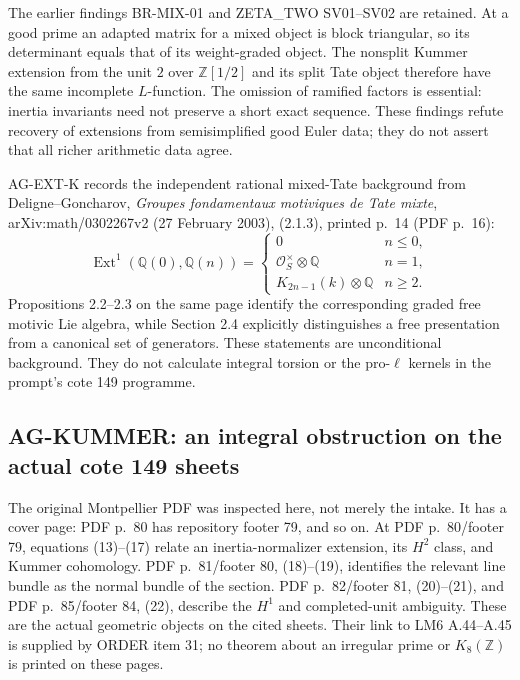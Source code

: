 \documentclass[11pt,a4paper]{article}
\begin{document}
The earlier findings BR-MIX-01 and ZETA\_TWO SV01--SV02 are retained.
At a good prime an adapted matrix for a mixed object is block triangular,
so its determinant equals that of its weight-graded object. The nonsplit
Kummer extension from the unit $2$ over $\mathbb Z[1/2]$ and its split
Tate object therefore have the same incomplete $L$-function. The omission
of ramified factors is essential: inertia invariants need not preserve a
short exact sequence. These findings refute recovery of extensions from
semisimplified good Euler data; they do not assert that all richer
arithmetic data agree.

AG-EXT-K records the independent rational mixed-Tate background from Deligne--Goncharov,
\emph{Groupes fondamentaux motiviques de Tate mixte},
arXiv:math/0302267v2 (27 February 2003), (2.1.3), printed p.~14
(PDF p.~16):
\[
 \operatorname{Ext}^1(\mathbb Q(0),\mathbb Q(n))=
 \begin{cases}
 0&n\le0,\\
 \mathcal O_S^\times\otimes\mathbb Q&n=1,\\
 K_{2n-1}(k)\otimes\mathbb Q&n\ge2.
 \end{cases}
\]
Propositions 2.2--2.3 on the same page identify the corresponding graded
free motivic Lie algebra, while Section 2.4 explicitly distinguishes a
free presentation from a canonical set of generators. These statements
are unconditional background. They do not calculate integral torsion or
the pro-$\ell$ kernels in the prompt's cote 149 programme.

\subsection{AG-KUMMER: an integral obstruction on the actual cote 149 sheets}
\label{ag:kummer}

The original Montpellier PDF was inspected here, not merely the intake.
It has a cover page: PDF p.~80 has repository footer 79, and so on.
At PDF p.~80/footer 79, equations (13)--(17) relate an inertia-normalizer
extension, its $H^2$ class, and Kummer cohomology. PDF p.~81/footer 80,
(18)--(19), identifies the relevant line bundle as the normal bundle of
the section. PDF p.~82/footer 81, (20)--(21), and PDF p.~85/footer 84,
(22), describe the $H^1$ and completed-unit ambiguity. These are the
actual geometric objects on the cited sheets. Their link to LM6
A.44--A.45 is supplied by ORDER item 31; no theorem about an irregular
prime or $K_8(\mathbb Z)$ is printed on these pages.
\end{document}
